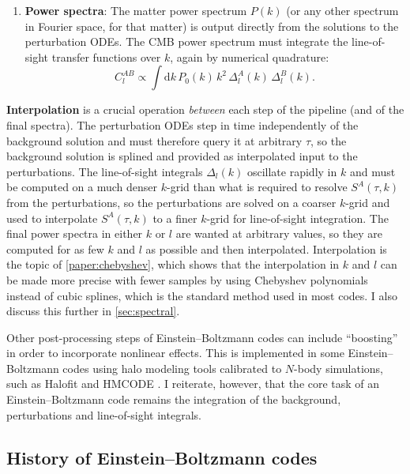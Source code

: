 \documentclass[USenglish, thumbmarks]{uiophdthesis} %
\newcommand\diff{\mathrm{d}}
\newcommand\EB{Einstein--Boltzmann}
\begin{document}
\begin{enumerate}
\item \textbf{Power spectra}:
The matter power spectrum $P(k)$ (or any other spectrum in Fourier space, for that matter) is output directly from the solutions to the perturbation ODEs.
The CMB power spectrum must integrate the line-of-sight transfer functions over $k$,
again by numerical quadrature:
\begin{equation}
C_l^{AB} \propto \int \diff{k}\,P_0(k)\,k^2\,\Delta_l^A(k)\,\Delta_l^B(k) .
\label{eq:Cl}
\end{equation}
\label{eb:spectra}
\end{enumerate}

\textbf{Interpolation} is a crucial operation \emph{between} each step of the pipeline (and of the final spectra).
The perturbation ODEs step in time independently of the background solution and must therefore query it at arbitrary $\tau$,
so the background solution is splined and provided as interpolated input to the perturbations.
The line-of-sight integrals $\Delta_l(k)$ oscillate rapidly in $k$
and must be computed on a much denser $k$-grid than what is required to resolve $S^A(\tau,k)$ from the perturbations,
so the perturbations are solved on a coarser $k$-grid and used to interpolate $S^A(\tau, k)$ to a finer $k$-grid for line-of-sight integration.
The final power spectra in either $k$ or $l$ are wanted at arbitrary values,
so they are computed for as few $k$ and $l$ as possible and then interpolated.
Interpolation is the topic of \cref{paper:chebyshev},
which shows that the interpolation in $k$ and $l$ can be made more precise with fewer samples by using Chebyshev polynomials
instead of cubic splines, which is the standard method used in most codes.
I also discuss this further in \cref{sec:spectral}.

Other post-processing steps of \EB{} codes can include \enquote{boosting} in order to incorporate nonlinear effects.
This is implemented in some \EB{} codes using halo modeling tools calibrated to $N$-body simulations, such as
Halofit \cite{smithStableClusteringHalo2003b,takahashiRevisingHalofitModel2012a}
and HMCODE \cite{meadAccurateHaloModel2015,meadAccurateHalomodelMatter2016,meadHMcode2020ImprovedModelling2021a}.
I reiterate, however, that the core task of an \EB{} code remains the integration of the background, perturbations and line-of-sight integrals.

\subsection{History of \EB{} codes}
\label{sec:history}
\end{document}
